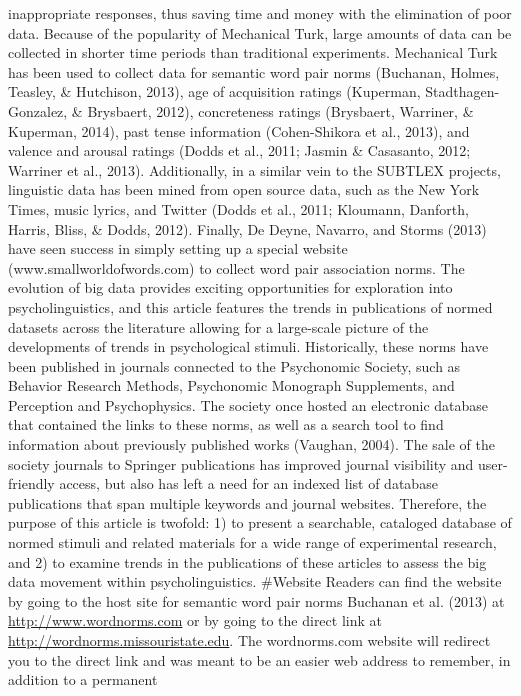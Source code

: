\documentclass[english,man]{apa6}
\theoremstyle{definition}
\theoremstyle{definition}
\theoremstyle{definition}
\theoremstyle{remark}
\begin{document}
inappropriate responses, thus saving time and money with the elimination
of poor data. Because of the popularity of Mechanical Turk, large
amounts of data can be collected in shorter time periods than
traditional experiments. Mechanical Turk has been used to collect data
for semantic word pair norms (Buchanan, Holmes, Teasley, \& Hutchison,
2013), age of acquisition ratings (Kuperman, Stadthagen-Gonzalez, \&
Brysbaert, 2012), concreteness ratings (Brysbaert, Warriner, \&
Kuperman, 2014), past tense information (Cohen-Shikora et al., 2013),
and valence and arousal ratings (Dodds et al., 2011; Jasmin \&
Casasanto, 2012; Warriner et al., 2013). Additionally, in a similar vein
to the SUBTLEX projects, linguistic data has been mined from open source
data, such as the New York Times, music lyrics, and Twitter (Dodds et
al., 2011; Kloumann, Danforth, Harris, Bliss, \& Dodds, 2012). Finally,
De Deyne, Navarro, and Storms (2013) have seen success in simply setting
up a special website (www.smallworldofwords.com) to collect word pair
association norms. The evolution of big data provides exciting
opportunities for exploration into psycholinguistics, and this article
features the trends in publications of normed datasets across the
literature allowing for a large-scale picture of the developments of
trends in psychological stimuli. Historically, these norms have been
published in journals connected to the Psychonomic Society, such as
Behavior Research Methods, Psychonomic Monograph Supplements, and
Perception and Psychophysics. The society once hosted an electronic
database that contained the links to these norms, as well as a search
tool to find information about previously published works (Vaughan,
2004). The sale of the society journals to Springer publications has
improved journal visibility and user-friendly access, but also has left
a need for an indexed list of database publications that span multiple
keywords and journal websites. Therefore, the purpose of this article is
twofold: 1) to present a searchable, cataloged database of normed
stimuli and related materials for a wide range of experimental research,
and 2) to examine trends in the publications of these articles to assess
the big data movement within psycholinguistics. \#Website Readers can
find the website by going to the host site for semantic word pair norms
Buchanan et al. (2013) at \url{http://www.wordnorms.com} or by going to
the direct link at \url{http://wordnorms.missouristate.edu}. The
wordnorms.com website will redirect you to the direct link and was meant
to be an easier web address to remember, in addition to a permanent
\end{document}
